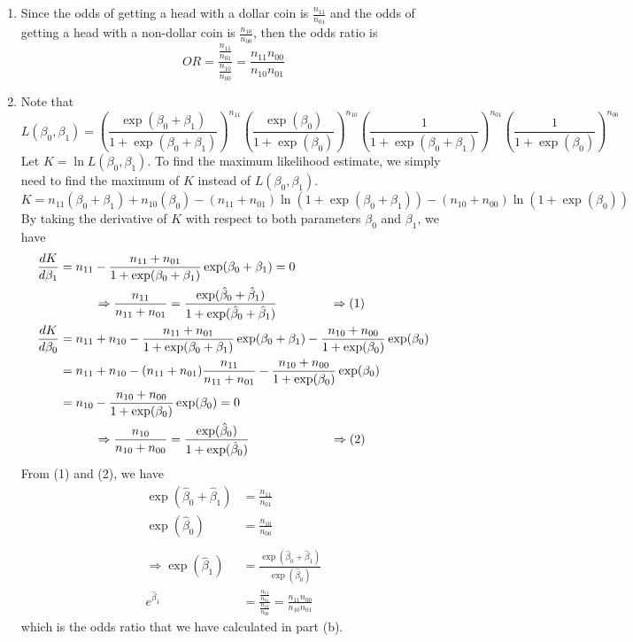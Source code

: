 \documentclass{article}
\begin{document}
\begin{enumerate}
\begin{enumerate}
        \item Since the odds of getting a head with a dollar coin is $\frac{n_{11}}{n_{01}}$ and the odds of getting a head with a non-dollar coin is $\frac{n_{10}}{n_{00}}$, then the odds ratio is
        \[OR = \frac{\frac{n_{11}}{n_{01}}}{\frac{n_{10}}{n_{00}}}=\frac{n_{11}n_{00}}{n_{10}n_{01}}\]
        
        \item Note that
        \[L(\beta_0,\beta_1)=\left(\frac{\exp(\beta_0+\beta_1)}{1+\exp(\beta_0+\beta_1)}\right)^{n_{11}}\left(\frac{\exp(\beta_0)}{1+\exp(\beta_0)}\right)^{n_{10}}\left(\frac{1}{1+\exp(\beta_0+\beta_1)}\right)^{n_{01}}\left(\frac{1}{1+\exp(\beta_0)}\right)^{n_{00}}\]
        Let $K=\ln L(\beta_0,\beta_1)$. To find the maximum likelihood estimate, we simply need to find the maximum of $K$ instead of $L(\beta_0,\beta_1)$.
        \[K=n_{11}(\beta_0+\beta_1)+n_{10}(\beta_0)-(n_{11}+n_{01})\ln(1+\exp(\beta_0+\beta_1))-(n_{10}+n_{00})\ln(1+\exp(\beta_0))\]
        By taking the derivative of $K$ with respect to both parameters $\beta_0$ and $\beta_1$, we have
        \begin{align*}
            \frac{dK}{d\beta_1}&=n_{11}-\frac{n_{11}+n_{01}}{1+\exp(\beta_0+\beta_1)}\exp(\beta_0+\beta_1)=0\\
            &\hspace{1 cm}\Rightarrow \frac{n_{11}}{n_{11}+n_{01}}=\frac{\exp(\hat{\beta}_0+\hat{\beta}_1)}{1+\exp(\hat{\beta}_0+\hat{\beta}_1)}\hspace{1.5 cm}\Rightarrow (1)\\
            \frac{dK}{d\beta_0}&=n_{11}+n_{10}-\frac{n_{11}+n_{01}}{1+\exp(\beta_0+\beta_1)}\exp(\beta_0+\beta_1)-\frac{n_{10}+n_{00}}{1+\exp(\beta_0)}\exp(\beta_0)\\
            &= n_{11}+n_{10}-(n_{11}+n_{01})\frac{n_{11}}{n_{11}+n_{01}}-\frac{n_{10}+n_{00}}{1+\exp(\beta_0)}\exp(\beta_0)\\
            &= n_{10}-\frac{n_{10}+n_{00}}{1+\exp(\beta_0)}\exp(\beta_0)=0\\
            &\hspace{1 cm}\Rightarrow \frac{n_{10}}{n_{10}+n_{00}}=\frac{\exp(\hat{\beta}_0)}{1+\exp(\hat{\beta}_0)}\hspace{2.3 cm}\Rightarrow (2)\\
        \end{align*}
        From (1) and (2), we have
        \begin{align*}
            \exp(\hat{\beta}_0+\hat{\beta}_1)&=\frac{n_{11}}{n_{01}}\\
            \exp(\hat{\beta}_0) &= \frac{n_{10}}{n_{00}}\\\\
            \Rightarrow \exp(\hat{\beta}_1)&=\frac{\exp(\hat{\beta}_0+\hat{\beta}_1)}{\exp(\hat{\beta}_0)}\\
            e^{\hat{\beta}_1}&=\frac{\frac{n_{11}}{n_{01}}}{\frac{n_{10}}{n_{00}}} = \frac{n_{11}n_{00}}{n_{10}n_{01}}
        \end{align*}
        which is the odds ratio that we have calculated in part (b).
    \end{enumerate}
    
\end{enumerate}
\end{document}
